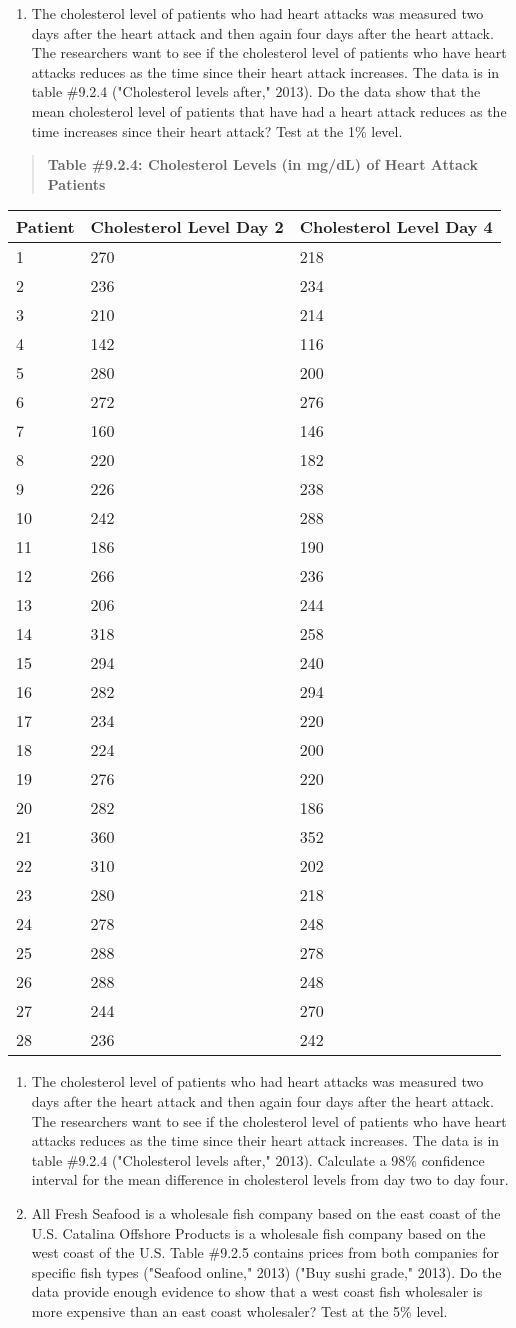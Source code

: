 \documentclass[]{book}
\providecommand{\tightlist}{%
  \setlength{\itemsep}{0pt}\setlength{\parskip}{0pt}}
\begin{document}
\begin{enumerate}
\def\labelenumi{\arabic{enumi}.}
\tightlist
\item
  The cholesterol level of patients who had heart attacks was measured two days after the heart attack and then again four days after the heart attack. The researchers want to see if the cholesterol level of patients who have heart attacks reduces as the time since their heart attack increases. The data is in table \#9.2.4 ("Cholesterol levels after," 2013). Do the data show that the mean cholesterol level of patients that have had a heart attack reduces as the time increases since their heart attack? Test at the 1\% level.
\end{enumerate}

\begin{quote}
\textbf{Table \#9.2.4: Cholesterol Levels (in mg/dL) of Heart Attack
Patients}
\end{quote}

\begin{longtable}[]{@{}lll@{}}
\toprule
Patient & Cholesterol Level Day 2 & Cholesterol Level Day 4\tabularnewline
\midrule
\endhead
1 & 270 & 218\tabularnewline
2 & 236 & 234\tabularnewline
3 & 210 & 214\tabularnewline
4 & 142 & 116\tabularnewline
5 & 280 & 200\tabularnewline
6 & 272 & 276\tabularnewline
7 & 160 & 146\tabularnewline
8 & 220 & 182\tabularnewline
9 & 226 & 238\tabularnewline
10 & 242 & 288\tabularnewline
11 & 186 & 190\tabularnewline
12 & 266 & 236\tabularnewline
13 & 206 & 244\tabularnewline
14 & 318 & 258\tabularnewline
15 & 294 & 240\tabularnewline
16 & 282 & 294\tabularnewline
17 & 234 & 220\tabularnewline
18 & 224 & 200\tabularnewline
19 & 276 & 220\tabularnewline
20 & 282 & 186\tabularnewline
21 & 360 & 352\tabularnewline
22 & 310 & 202\tabularnewline
23 & 280 & 218\tabularnewline
24 & 278 & 248\tabularnewline
25 & 288 & 278\tabularnewline
26 & 288 & 248\tabularnewline
27 & 244 & 270\tabularnewline
28 & 236 & 242\tabularnewline
\bottomrule
\end{longtable}

\begin{enumerate}
\def\labelenumi{\arabic{enumi}.}
\setcounter{enumi}{1}
\item
  The cholesterol level of patients who had heart attacks was measured two days after the heart attack and then again four days after the heart attack. The researchers want to see if the cholesterol level of patients who have heart attacks reduces as the time since their heart attack increases. The data is in table \#9.2.4 ("Cholesterol levels after," 2013). Calculate a 98\% confidence interval for the mean difference in cholesterol levels from day two to day four.
\item
  All Fresh Seafood is a wholesale fish company based on the east coast of the U.S. Catalina Offshore Products is a wholesale fish company based on the west coast of the U.S. Table \#9.2.5 contains prices from both companies for specific fish types ("Seafood online," 2013) ("Buy sushi grade," 2013). Do the data provide enough evidence to show that a west coast fish wholesaler is more expensive than an east coast wholesaler? Test at the 5\% level.
\end{enumerate}
\end{document}
